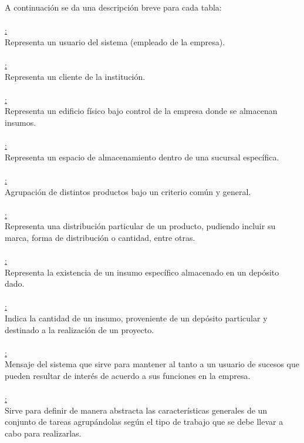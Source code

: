 \documentclass[a4paper, 12pt,twoside]{report}  %
\numberwithin{equation}{subsection} %
\begin{document}
A continuación se da una descripción breve para cada tabla:\\\\
\underline{:}\\
Representa un usuario del sistema (empleado de la empresa).\\
\\
\underline{:}\\
Representa un cliente de la institución.\\
\\
\underline{:}\\
Representa un edificio físico bajo control de la empresa donde se almacenan insumos.\\
\\
\underline{:}\\
Representa un espacio de almacenamiento dentro de una sucursal específica.\\
\\
\underline{:}\\
Agrupación de distintos productos bajo un criterio común y general.\\
\\
\underline{:}\\
Representa una distribución particular de un producto, pudiendo incluir su marca, forma de distribución o cantidad, entre otras.\\
\\
\underline{:}\\
Representa la existencia de un insumo específico almacenado en un depósito dado.\\
\\
\underline{:}\\
Indica la cantidad de un insumo, proveniente de un depósito particular y destinado a la realización de un proyecto.\\
\\
\underline{:}\\
Mensaje del sistema que sirve para mantener al tanto a un usuario de sucesos que pueden resultar de interés de acuerdo a sus funciones en la empresa.\\
\\
\underline{:}\\
Sirve para definir de manera abstracta las características generales de un conjunto de tareas agrupándolas según el tipo de trabajo que se debe llevar a cabo para realizarlas.\\
\end{document}
